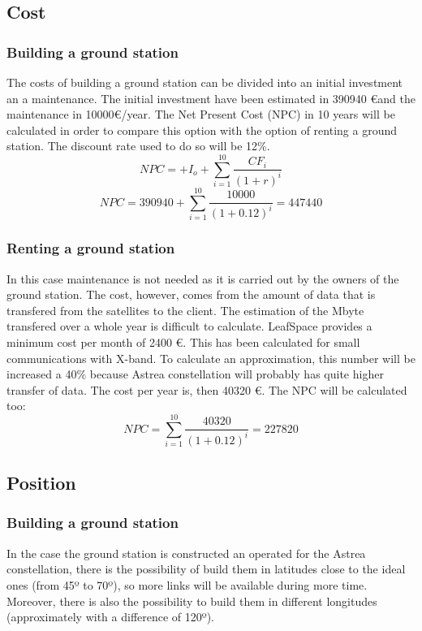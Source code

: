 \subsection{Cost}
\subsubsection{Building a ground station}
The costs of building a ground station can be divided into an initial investment an a maintenance. The initial investment have been estimated in 390940 \euro and the maintenance in 10000\euro /year. The Net Present Cost (NPC) in 10 years will be calculated in order to compare this option with the option of renting a ground station. The discount rate used to do so will be 12\%.
\begin{equation}
NPC=+I_{o}+\sum_{i=1}^{10} \frac{CF_{i}}{(1+r)^i}
\end{equation}
\begin{equation}
NPC=390940+\sum_{i=1}^{10} \frac{10000}{(1+0.12)^i}=447440
\end{equation}
\subsubsection{Renting a ground station}
In this case maintenance is not needed as it is carried out by the owners of the ground station. The cost, however, comes from the amount of data that is transfered from the satellites to the client. The estimation of the Mbyte transfered over a whole year is difficult to calculate. LeafSpace provides a minimum cost per month of 2400 \euro . This has been calculated for small communications  with X-band. To calculate an approximation, this number will be increased a 40\% because Astrea constellation will probably has quite higher transfer of data. The cost per year is, then 40320 \euro. The NPC will be calculated too: 
 \begin{equation}
NPC=\sum_{i=1}^{10} \frac{40320}{(1+0.12)^i}=227820 
\end{equation}
\subsection{Position}
\subsubsection{Building a ground station}
In the case the ground station is constructed an operated for the Astrea constellation, there is the possibility of build them in latitudes close to the ideal ones (from 45º to 70º), so more links will be available during more time. Moreover, there is also the possibility to build them in different longitudes (approximately with a difference of 120º). 
